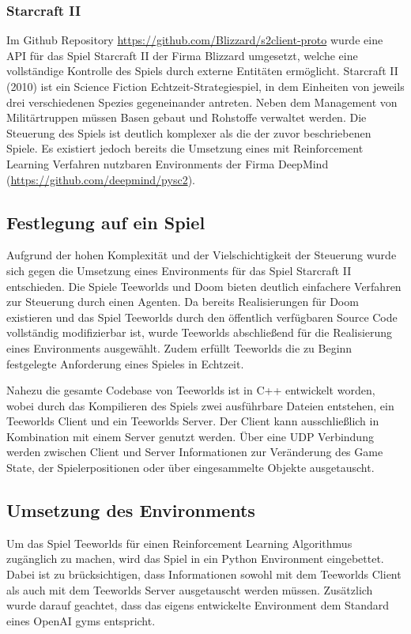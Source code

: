 \documentclass[11pt]{scrartcl}
\begin{document}
\subsubsection{Starcraft II}
Im Github Repository \url{https://github.com/Blizzard/s2client-proto} wurde eine API für das Spiel
Starcraft II der Firma Blizzard umgesetzt, welche eine vollständige Kontrolle des Spiels durch
externe Entitäten ermöglicht. Starcraft II (2010) ist ein Science Fiction Echtzeit-Strategiespiel,
in dem Einheiten von jeweils drei verschiedenen Spezies gegeneinander antreten. Neben dem
Management von Militärtruppen müssen Basen gebaut und Rohstoffe verwaltet werden. Die Steuerung
des Spiels ist deutlich komplexer als die der zuvor beschriebenen Spiele. Es existiert jedoch
bereits die Umsetzung eines mit Reinforcement Learning Verfahren nutzbaren Environments der Firma
DeepMind (\url{https://github.com/deepmind/pysc2}). 

\subsection{Festlegung auf ein Spiel}
Aufgrund der hohen Komplexität und der Vielschichtigkeit der Steuerung wurde sich gegen die Umsetzung
eines Environments für das Spiel Starcraft II entschieden. Die Spiele Teeworlds und Doom bieten
deutlich einfachere Verfahren zur Steuerung durch einen Agenten. Da bereits Realisierungen für Doom
existieren und das Spiel Teeworlds durch den öffentlich verfügbaren Source Code vollständig modifizierbar
ist, wurde Teeworlds abschließend für die Realisierung eines Environments ausgewählt. Zudem erfüllt
Teeworlds die zu Beginn festgelegte Anforderung eines Spieles in Echtzeit.

Nahezu die gesamte Codebase von Teeworlds ist in C++ entwickelt worden, wobei durch das Kompilieren
des Spiels zwei ausführbare Dateien entstehen, ein Teeworlds Client und ein Teeworlds Server. Der
Client kann ausschließlich in Kombination mit einem Server genutzt werden. Über eine UDP Verbindung
werden zwischen Client und Server Informationen zur Veränderung des Game State, der Spielerpositionen
oder über eingesammelte Objekte ausgetauscht.

\subsection{Umsetzung des Environments}
Um das Spiel Teeworlds für einen Reinforcement Learning Algorithmus zugänglich zu machen,
wird das Spiel in ein Python Environment eingebettet. Dabei ist zu brücksichtigen, dass
Informationen sowohl mit dem Teeworlds Client als auch mit dem Teeworlds Server ausgetauscht
werden müssen. Zusätzlich wurde darauf geachtet, dass das eigens entwickelte Environment dem
Standard eines OpenAI gyms entspricht.
\end{document}
